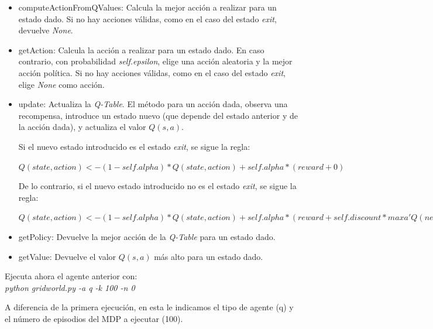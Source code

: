 \documentclass[11pt]{exam}
\begin{document}
\begin{questions}
\begin{itemize}
	\item computeActionFromQValues: Calcula la mejor acción a realizar para un estado dado. Si no hay acciones válidas, como en el caso del estado \textit{exit}, devuelve \textit{None}.
	
	\item getAction: Calcula la acción a realizar para un estado dado. En caso contrario, con probabilidad \textit{self.epsilon}, elige una acción aleatoria y la mejor acción política. Si no hay acciones válidas, como en el caso del estado \textit{exit}, elige \textit{None} como acción.
	
	\item update: Actualiza la \textit{Q-Table}. El método para un acción dada, observa una recompensa, introduce un estado nuevo (que depende del estado anterior y de la acción dada), y actualiza el valor $Q(s,a)$. 
	
	Si el nuevo estado introducido es el estado \textit{exit}, se sigue la regla:
	
	\begin{center}
		$Q(state,action) <- (1-self.alpha) * Q(state,action) + self.alpha * (reward + 0)$
	\end{center}

	De lo contrario, si el nuevo estado introducido no es el estado \textit{exit}, se sigue la regla:
	
	\begin{center}
		$Q(state,action) <- (1-self.alpha) * Q(state,action) + self.alpha * (reward + self.discount * max a' Q(nextState, a'))$
	\end{center}
	
	\item getPolicy: Devuelve la mejor acción de la \textit{Q-Table} para un estado dado.
	
	\item getValue: Devuelve el valor $Q(s,a)$ más alto para un estado dado.
		
\end{itemize}

{ \question Ejecuta ahora el agente anterior con: \\ \textit{python gridworld.py -a q -k 100 -n 0}}

A diferencia de la primera ejecución, en esta le indicamos el tipo de agente (q) y el número de episodios del MDP a ejecutar (100).


\end{questions}
\end{document}
